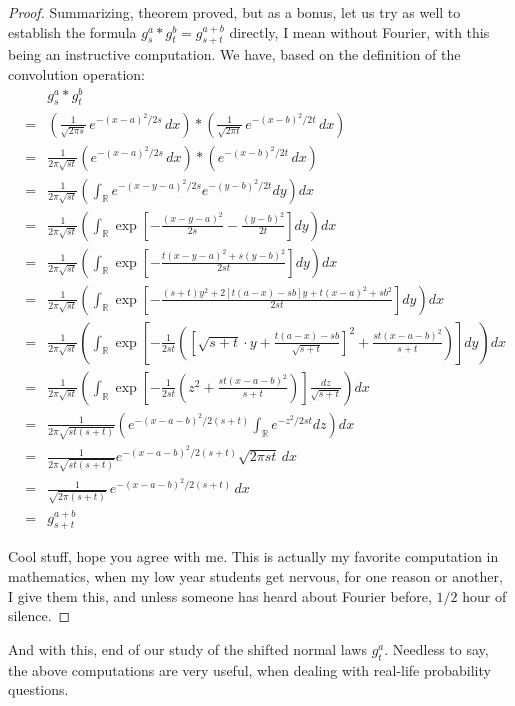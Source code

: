 \documentclass[12pt]{amsbook}
\begin{document}
\begin{proof}
Summarizing, theorem proved, but as a bonus, let us try as well to establish the formula $g_s^a*g_t^b=g_{s+t}^{a+b}$ directly, I mean without Fourier, with this being an instructive computation. We have, based on the definition of the convolution operation:
\begin{eqnarray*}
&&g_s^a*g_t^b\\
&=&\left(\frac{1}{\sqrt{2\pi s}}\,e^{-(x-a)^2/2s}\,dx\right)*
\left(\frac{1}{\sqrt{2\pi t}}\,e^{-(x-b)^2/2t}\,dx\right)\\
&=&\frac{1}{2\pi\sqrt{st}}\left(e^{-(x-a)^2/2s}\,dx\right)*\left(e^{-(x-b)^2/2t}\,dx\right)\\
&=&\frac{1}{2\pi\sqrt{st}}\left(\int_\mathbb Re^{-(x-y-a)^2/2s}e^{-(y-b)^2/2t}dy\right)dx\\
&=&\frac{1}{2\pi\sqrt{st}}\left(\int_\mathbb R\exp\left[-\frac{(x-y-a)^2}{2s}-\frac{(y-b)^2}{2t}\right]dy\right)dx\\
&=&\frac{1}{2\pi\sqrt{st}}\left(\int_\mathbb R\exp\left[-\frac{t(x-y-a)^2+s(y-b)^2}{2st}\right]dy\right)dx\\
&=&\frac{1}{2\pi\sqrt{st}}\left(\int_\mathbb R\exp\left[-\frac{(s+t)y^2+2[t(a-x)-sb]y+t(x-a)^2+sb^2}{2st}\right]dy\right)dx\\
&=&\frac{1}{2\pi\sqrt{st}}\left(\int_\mathbb R\exp\left[-\frac{1}{2st}\left(\left[\sqrt{s+t}\cdot y+\frac{t(a-x)-sb}{\sqrt{s+t}}\right]^2+\frac{st(x-a-b)^2}{s+t}\right)\right]dy\right)dx\\
&=&\frac{1}{2\pi\sqrt{st}}\left(\int_\mathbb R\exp\left[-\frac{1}{2st}\left(z^2+\frac{st(x-a-b)^2}{s+t}\right)\right]\frac{dz}{\sqrt{s+t}}\right)dx\\
&=&\frac{1}{2\pi\sqrt{st(s+t)}}\left(e^{-(x-a-b)^2/2(s+t)}\int_\mathbb Re^{-z^2/2st}dz\right)dx\\
&=&\frac{1}{2\pi\sqrt{st(s+t)}}e^{-(x-a-b)^2/2(s+t)}\sqrt{2\pi st}\,dx\\
&=&\frac{1}{\sqrt{2\pi(s+t)}}\,e^{-(x-a-b)^2/2(s+t)}\,dx\\
&=&g_{s+t}^{a+b}
\end{eqnarray*}

Cool stuff, hope you agree with me. This is actually my favorite computation in mathematics, when my low year students get nervous, for one reason or another, I give them this, and unless someone has heard about Fourier before, $1/2$ hour of silence.
\end{proof}

And with this, end of our study of the shifted normal laws $g_t^a$. Needless to say, the above computations are very useful, when dealing with real-life probability questions.
\end{document}
